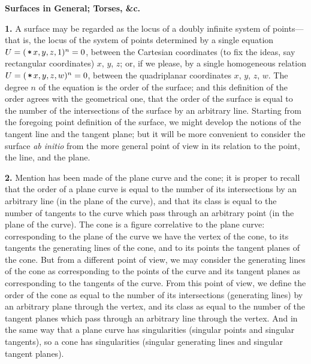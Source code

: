 \documentclass[11pt,a4paper]{book}
\begin{document}
\bigskip
\noindent\textbf{Surfaces in General; Torses, \&c.}

\smallskip

\textbf{1.}\quad
A surface may be regarded as the locus of a doubly infinite system of points---that is, the locus of the system of points determined by a single equation $U = (\,\raisebox{0.15ex}{\ensuremath{*\!\!\!*}}\, x, y, z, 1)^{n} = 0$, between the Cartesian coordinates (to fix the ideas, say rectangular coordinates) $x$, $y$, $z$; or, if we please, by a single homogeneous relation $U = (\,\raisebox{0.15ex}{\ensuremath{*\!\!\!*}}\, x, y, z, w)^{n} = 0$, between the quadriplanar coordinates $x$, $y$, $z$, $w$. The degree $n$ of the equation is the order of the surface; and this definition of the order agrees with the geometrical one, that the order of the surface is equal to the number of the intersections of the surface by an arbitrary line. Starting from the foregoing point definition of the surface, we might develop the notions of the tangent line and the tangent plane; but it will be more convenient to consider the surface \textit{ab initio} from the more general point of view in its relation to the point, the line, and the plane.

\textbf{2.}\quad
Mention has been made of the plane curve and the cone; it is proper to recall that the order of a plane curve is equal to the number of its intersections by an arbitrary line (in the plane of the curve), and that its class is equal to the number of tangents to the curve which pass through an arbitrary point (in the plane of the curve). The cone is a figure correlative to the plane curve: corresponding to the plane of the curve we have the vertex of the cone, to its tangents the generating lines of the cone, and to its points the tangent planes of the cone. But from a different point of view, we may consider the generating lines of the cone as corresponding to the points of the curve and its tangent planes as corresponding to the tangents of the curve. From this point of view, we define the order of the cone as equal to the number of its intersections (generating lines) by an arbitrary plane through the vertex, and its class as equal to the number of the tangent planes which pass through an arbitrary line through the vertex. And in the same way that a plane curve has singularities (singular points and singular tangents), so a cone has singularities (singular generating lines and singular tangent planes).
\end{document}
